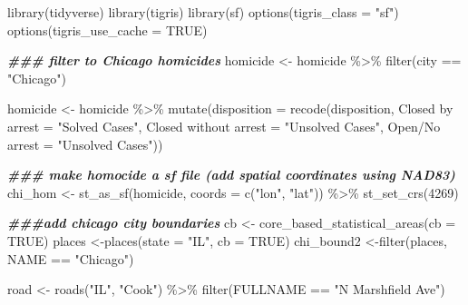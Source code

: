 \documentclass[
]{article}
\newenvironment{Shaded}{\begin{snugshade}}{\end{snugshade}}
\newcommand{\AttributeTok}[1]{\textcolor[rgb]{0.77,0.63,0.00}{#1}}
\newcommand{\ConstantTok}[1]{\textcolor[rgb]{0.00,0.00,0.00}{#1}}
\newcommand{\DecValTok}[1]{\textcolor[rgb]{0.00,0.00,0.81}{#1}}
\newcommand{\DocumentationTok}[1]{\textcolor[rgb]{0.56,0.35,0.01}{\textbf{\textit{#1}}}}
\newcommand{\FunctionTok}[1]{\textcolor[rgb]{0.00,0.00,0.00}{#1}}
\newcommand{\NormalTok}[1]{#1}
\newcommand{\OtherTok}[1]{\textcolor[rgb]{0.56,0.35,0.01}{#1}}
\newcommand{\SpecialCharTok}[1]{\textcolor[rgb]{0.00,0.00,0.00}{#1}}
\newcommand{\StringTok}[1]{\textcolor[rgb]{0.31,0.60,0.02}{#1}}
\begin{document}
\begin{Shaded}
\begin{Highlighting}[]
\FunctionTok{library}\NormalTok{(tidyverse)}
\FunctionTok{library}\NormalTok{(tigris)}
\FunctionTok{library}\NormalTok{(sf)}
\FunctionTok{options}\NormalTok{(}\AttributeTok{tigris\_class =} \StringTok{"sf"}\NormalTok{)}
\FunctionTok{options}\NormalTok{(}\AttributeTok{tigris\_use\_cache =} \ConstantTok{TRUE}\NormalTok{)}


\DocumentationTok{\#\#\# filter to Chicago homicides}
\NormalTok{homicide }\OtherTok{\textless{}{-}}\NormalTok{ homicide }\SpecialCharTok{\%\textgreater{}\%}
  \FunctionTok{filter}\NormalTok{(city }\SpecialCharTok{==} \StringTok{"Chicago"}\NormalTok{) }
  
\NormalTok{homicide }\OtherTok{\textless{}{-}}\NormalTok{ homicide }\SpecialCharTok{\%\textgreater{}\%} 
  \FunctionTok{mutate}\NormalTok{(}\AttributeTok{disposition =} \FunctionTok{recode}\NormalTok{(disposition,}
                   \StringTok{\textquotesingle{}Closed by arrest\textquotesingle{}} \OtherTok{=} \StringTok{"Solved Cases"}\NormalTok{,}
                   \StringTok{\textquotesingle{}Closed without arrest\textquotesingle{}} \OtherTok{=} \StringTok{"Unsolved Cases"}\NormalTok{,}
                   \StringTok{\textquotesingle{}Open/No arrest\textquotesingle{}} \OtherTok{=} \StringTok{"Unsolved Cases"}\NormalTok{))}

\DocumentationTok{\#\#\# make homocide a sf file (add spatial coordinates using NAD83)}
\NormalTok{chi\_hom }\OtherTok{\textless{}{-}} \FunctionTok{st\_as\_sf}\NormalTok{(homicide, }\AttributeTok{coords =} \FunctionTok{c}\NormalTok{(}\StringTok{"lon"}\NormalTok{, }\StringTok{"lat"}\NormalTok{)) }\SpecialCharTok{\%\textgreater{}\%} 
  \FunctionTok{st\_set\_crs}\NormalTok{(}\DecValTok{4269}\NormalTok{)}

\DocumentationTok{\#\#\#add chicago city boundaries}
\NormalTok{cb }\OtherTok{\textless{}{-}} \FunctionTok{core\_based\_statistical\_areas}\NormalTok{(}\AttributeTok{cb =} \ConstantTok{TRUE}\NormalTok{)}
\NormalTok{places }\OtherTok{\textless{}{-}}\FunctionTok{places}\NormalTok{(}\AttributeTok{state =} \StringTok{"IL"}\NormalTok{, }\AttributeTok{cb =} \ConstantTok{TRUE}\NormalTok{)}
\NormalTok{chi\_bound2 }\OtherTok{\textless{}{-}}\FunctionTok{filter}\NormalTok{(places, NAME }\SpecialCharTok{==} \StringTok{"Chicago"}\NormalTok{)}

\NormalTok{road }\OtherTok{\textless{}{-}} \FunctionTok{roads}\NormalTok{(}\StringTok{"IL"}\NormalTok{, }\StringTok{"Cook"}\NormalTok{) }\SpecialCharTok{\%\textgreater{}\%} 
  \FunctionTok{filter}\NormalTok{(FULLNAME }\SpecialCharTok{==} \StringTok{"N Marshfield Ave"}\NormalTok{)}


\end{Highlighting}
\end{Shaded}
\end{document}
